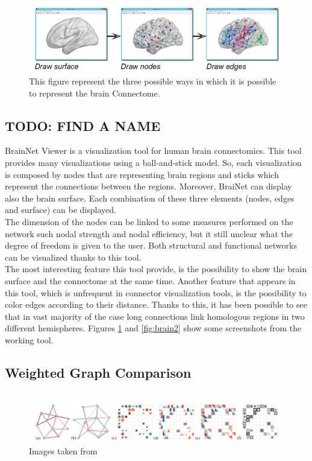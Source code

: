 \documentclass{article}
\begin{document}
\begin{multicols}{2}
\begin{figure}[ht]
\centerline{\includegraphics[width=1.9\columnwidth]{brain1}}
\caption{This figure represent the three possible ways in which it is possible to represent the brain Connectome.}
    \label{fig:brain1}
\end{figure}


\subsection{TODO: FIND A NAME}
BrainNet Viewer \cite{brainNetViewer} is a visualization tool for human brain connectomics. This tool provides many visualizations using a ball-and-stick model. So, each visualization is composed by nodes that are representing brain regions and sticks which represent the connections between the regions. Moreover, BraiNet can display also the brain surface. Each combination of these three elements (nodes, edges and surface) can be displayed.\\
The dimension of the nodes can be linked to some measures performed on the network such nodal strength and nodal efficiency, but it still unclear what the degree of freedom is given to the user. Both structural and functional networks can be visualized thanks to this tool.\\
The most interesting feature this tool provide, is the possibility to show the brain surface and the connectome at the same time. Another feature that appears in this tool, which is unfrequent in connector visualization tools, is the possibility to color edges according to their distance. Thanks to this, it has been possible to see that in vast majority of the case long connections link homologous regions in two different hemispheres. Figures \ref{fig:brain1} and \ref{fig:brain2} show some screenshots from the working tool.




\subsection{Weighted Graph Comparison}
\begin{figure}[ht]
\centering
\includegraphics[width = 1.8\columnwidth]{weightedGraphs}
\caption{Images taken from \cite{weightedGraphComparison}}
\label{fig:weightedGraph}
\end{figure}


\end{multicols}
\end{document}

